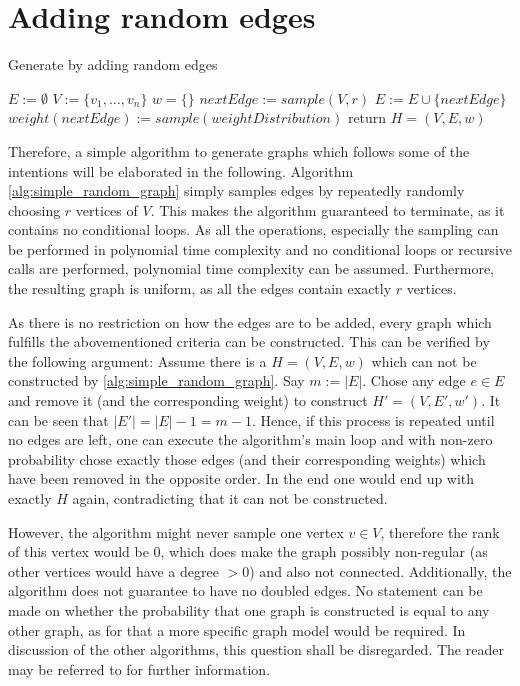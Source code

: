 \section{Adding random edges}
\begin{algorithm}[htpb]
	\caption{Generate by adding random edges\label{alg:simple_random_graph}} 
	\begin{algorithmic}
		\State $E := \emptyset$
		\State $V := \{v_1, \ldots, v_n\}$
		\State $w = \{\}$
		\State $nextEdge := sample(V, r) $
		\State $E := E \cup	 \{nextEdge\}$ %
		\State $weight(nextEdge) := sample(weightDistribution)$ 
		\EndFor
		\State return $H = (V, E, w)$
		\EndFunction 
	\end{algorithmic}
\end{algorithm}	
Therefore, a simple algorithm to generate graphs which follows some of the intentions will be elaborated in the following. Algorithm \ref{alg:simple_random_graph} simply samples edges by repeatedly randomly choosing $r$ vertices of $V$. 
This makes the algorithm guaranteed to terminate, as it contains no conditional loops. As all the operations, especially the sampling can be performed in polynomial time complexity and no conditional loops or recursive calls are performed, polynomial time complexity can be assumed. Furthermore, the resulting graph is uniform, as all the edges contain exactly $r$ vertices. 

As there is no restriction on how the edges are to be added, every graph which fulfills the abovementioned criteria can be constructed. This can be verified by the following argument: Assume there is a $H = (V, E, w)$ which can not be constructed by \cref{alg:simple_random_graph}. Say $m:=|E|$. Chose any edge $e \in E$ and remove it (and the corresponding weight) to construct $H' = (V, E', w')$. It can be seen that $|E'|= |E|-1 = m-1 $. Hence, if this process is repeated until no edges are left, one can execute the algorithm's main loop and with non-zero probability chose exactly those edges (and their corresponding weights) which have been removed in the opposite order. In the end one would end up with exactly $H$ again, contradicting that it can not be constructed.

However, the algorithm might never sample one vertex $v \in V$, therefore the rank of this vertex would be $0$, which does make the graph possibly non-regular (as other vertices would have a degree $>0$) and also not connected. Additionally, the algorithm does not guarantee to have no doubled edges. No statement can be made on whether the probability that one graph is constructed is equal to any other graph, as for that a more specific graph model would be required. In discussion of the other algorithms, this question shall be disregarded. The reader may be referred to \cite{ghoshal2009random} for further information.

